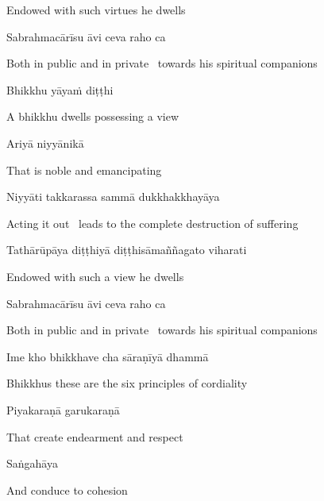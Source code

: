 \begin{english}
  Endowed with such virtues he dwells
\end{english}

Sabrahmacārīsu āvi ceva raho ca

\begin{english}
  Both in public and in private \breathmark\ towards his spiritual companions
\end{english}

Bhikkhu yāyaṁ diṭṭhi

\begin{english}
  A bhikkhu dwells possessing a view
\end{english}

Ariyā niyyānikā

\begin{english}
  That is noble and emancipating
\end{english}

Niyyāti takkarassa sammā dukkhakkhayāya

\begin{english}
  Acting it out \breathmark\ leads to the complete destruction of suffering
\end{english}

Tathārūpāya diṭṭhiyā diṭṭhisāmaññagato viharati

\begin{english}
  Endowed with such a view he dwells
\end{english}

Sabrahmacārīsu āvi ceva raho ca

\begin{english}
  Both in public and in private \breathmark\ towards his spiritual companions
\end{english}

Ime kho bhikkhave cha sāraṇīyā dhammā

\begin{english}
  Bhikkhus these are the six principles of cordiality
\end{english}

Piyakaraṇā garukaraṇā

\begin{english}
  That create endearment and respect
\end{english}

Saṅgahāya

\begin{english}
  And conduce to cohesion
\end{english}

